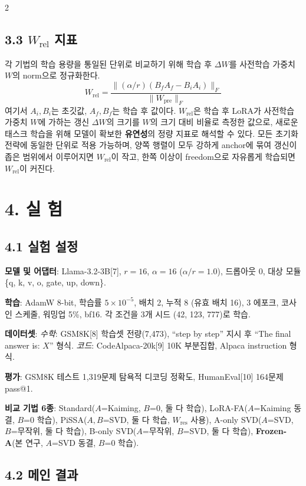 \documentclass[a4paper,10pt]{article}
\begin{document}
\begin{multicols}{2}
\subsection*{3.3 $W_{\text{rel}}$ 지표}

각 기법의 학습 용량을 통일된 단위로 비교하기 위해 학습 후 $\Delta W$를 사전학습 가중치 $W$의 norm으로 정규화한다.
\[
W_{\text{rel}} = \frac{\|(\alpha/r)(B_f A_f - B_i A_i)\|_F}{\|W_{\text{pre}}\|_F}
\]
여기서 $A_i, B_i$는 초깃값, $A_f, B_f$는 학습 후 값이다. $W_{\text{rel}}$은 학습 후 LoRA가 사전학습 가중치 $W$에 가하는 갱신 $\Delta W$의 크기를 $W$의 크기 대비 비율로 측정한 값으로, 새로운 태스크 학습을 위해 모델이 확보한 \textbf{유연성}의 정량 지표로 해석할 수 있다. 모든 초기화 전략에 동일한 단위로 적용 가능하며, 양쪽 행렬이 모두 강하게 anchor에 묶여 갱신이 좁은 범위에서 이루어지면 $W_{\text{rel}}$이 작고, 한쪽 이상이 freedom으로 자유롭게 학습되면 $W_{\text{rel}}$이 커진다.

\section*{4. 실 험}

\subsection*{4.1 실험 설정}

\textbf{모델 및 어댑터}: Llama-3.2-3B[7], $r=16$, $\alpha=16$ ($\alpha/r=1.0$), 드롭아웃 0, 대상 모듈 \{q, k, v, o, gate, up, down\}.

\textbf{학습}: AdamW 8-bit, 학습률 $5\times 10^{-5}$, 배치 2, 누적 8 (유효 배치 16), 3 에포크, 코사인 스케줄, 워밍업 5\%, bf16. 각 조건을 3개 시드 (42, 123, 777)로 학습.

\textbf{데이터셋}: \textit{수학}: GSM8K[8] 학습셋 전량(7,473), ``step by step'' 지시 후 ``The final answer is: $X$'' 형식. \textit{코드}: CodeAlpaca-20k[9] 10K 부분집합, Alpaca instruction 형식.

\textbf{평가}: GSM8K 테스트 1,319문제 탐욕적 디코딩 정확도, HumanEval[10] 164문제 pass@1.

\textbf{비교 기법 6종}: Standard($A$=Kaiming, $B$=0, 둘 다 학습), LoRA-FA($A$=Kaiming 동결, $B$=0 학습), PiSSA($A,B$=SVD, 둘 다 학습, $W_{\text{res}}$ 사용), A-only SVD($A$=SVD, $B$=무작위, 둘 다 학습), B-only SVD($A$=무작위, $B$=SVD, 둘 다 학습), \textbf{Frozen-A}(본 연구, $A$=SVD 동결, $B$=0 학습).

\subsection*{4.2 메인 결과}


\end{multicols}
\end{document}
